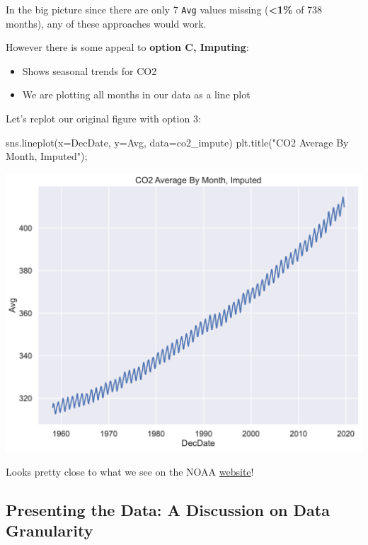 \documentclass[
  letterpaper,
  DIV=11,
  numbers=noendperiod]{scrreprt}
\newenvironment{Shaded}{\begin{snugshade}}{\end{snugshade}}
\newcommand{\NormalTok}[1]{\textcolor[rgb]{0.00,0.23,0.31}{#1}}
\newcommand{\OperatorTok}[1]{\textcolor[rgb]{0.37,0.37,0.37}{#1}}
\newcommand{\StringTok}[1]{\textcolor[rgb]{0.13,0.47,0.30}{#1}}
\providecommand{\tightlist}{%
  \setlength{\itemsep}{0pt}\setlength{\parskip}{0pt}}\usepackage{longtable,booktabs,array}
\begin{document}
In the big picture since there are only 7 \texttt{Avg} values missing
(\textbf{\textless1\%} of 738 months), any of these approaches would
work.

However there is some appeal to \textbf{option C, Imputing}:

\begin{itemize}
\tightlist
\item
  Shows seasonal trends for CO2
\item
  We are plotting all months in our data as a line plot
\end{itemize}

Let's replot our original figure with option 3:

\begin{Shaded}
\begin{Highlighting}[]
\NormalTok{sns.lineplot(x}\OperatorTok{=}\StringTok{\textquotesingle{}DecDate\textquotesingle{}}\NormalTok{, y}\OperatorTok{=}\StringTok{\textquotesingle{}Avg\textquotesingle{}}\NormalTok{, data}\OperatorTok{=}\NormalTok{co2\_impute)}
\NormalTok{plt.title(}\StringTok{"CO2 Average By Month, Imputed"}\NormalTok{)}\OperatorTok{;}
\end{Highlighting}
\end{Shaded}

\includegraphics{eda/eda_files/figure-pdf/cell-76-output-1.pdf}

Looks pretty close to what we see on the NOAA
\href{https://gml.noaa.gov/ccgg/trends/}{website}!

\subsection{Presenting the Data: A Discussion on Data
Granularity}\label{presenting-the-data-a-discussion-on-data-granularity}
\end{document}
